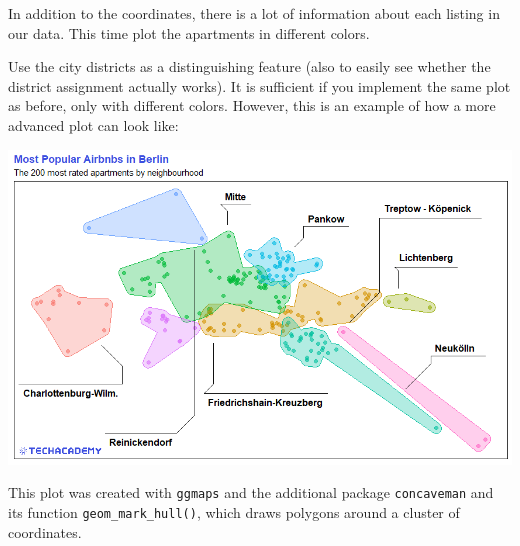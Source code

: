 \documentclass[
  11pt,
]{article}
\newenvironment{tips}[1]
  {
  \begin{itemize}
  \footnotesize
  \renewcommand{\labelitemi}{
    \raisebox{-.7\height}[0pt][0pt]{
      {\setkeys{Gin}{width=3em,keepaspectratio}
        \texttt{[image: images/\#1.png]}}
    }
  }
  \setlength{\fboxsep}{1em}
  \begin{rbox}
  \item
  }
  {
  \end{rbox}
  \end{itemize}
  }
\begin{document}
In addition to the coordinates, there is a lot of information about each listing in our data. This time plot the apartments in different colors.

Use the city districts as a distinguishing feature (also to easily see whether the district assignment actually works). It is sufficient if you implement the same plot as before, only with different colors. However, this is an example of how a more advanced plot can look like:

\begin{center}\includegraphics[width=1\linewidth]{plot/4_2_map_top200_by_neighbourhood} \end{center}

\begin{tips}r

This plot was created with \texttt{ggmaps} and the additional package \texttt{concaveman} and its function \texttt{geom\_mark\_hull()}, which draws polygons around a cluster of coordinates.

\end{tips}
\end{document}
